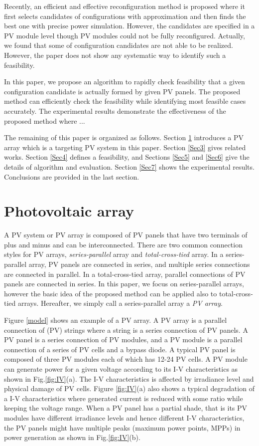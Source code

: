 \documentclass[conference]{IEEEtran}
\begin{document}
Recently, an efficient and effective reconfiguration method\cite{orozco2016optimized} is proposed where it first selects candidates of configurations with approximation and then finds the best one with precise power simulation. However, the candidates are specified in a PV module level though PV modules could not be fully reconfigured. Actually, we found that some of configuration candidates are not able to be realized. However, the paper\cite{orozco2016optimized}  does not show any systematic way to identify such a feasibility. 

In this paper, we propose an algorithm to rapidly check feasibility that a given configuration candidate is actually formed by given PV panels. The proposed method can efficiently check the feasibility while identifying most feasible cases accurately. The experimental results demonstrate the effectiveness of the proposed method where ...

The remaining of this paper is organized as follows. Section \ref{Sec2} introduces a PV array which is a targeting PV system in this paper. Section \ref{Sec3} gives related works. Section \ref{Sec4} defines a feasibility, and Sections \ref{Sec5} and \ref{Sec6} give the details of algorithm and evaluation. Section \ref{Sec7} shows the experimental results. Conclusions are provided in the last section.

\section{Photovoltaic array}\label{Sec2}
A PV system or PV array is composed of PV panels that have two terminals of plus and minus and can be interconnected. There are two common connection styles for PV arrays, \textit{series-parallel} array and \textit{total-cross-tied} array. 
In a series-parallel array, PV panels are connected in series, and multiple series connections are connected in parallel. In a total-cross-tied array, parallel connections of PV panels are connected in series. In this paper, we focus on series-parallel arrays, however the basic idea of the proposed method can be applied also to total-cross-tied arrays. Hereafter, we simply call a series-parallel array a \textit{PV array}. 

Figure \ref{model} shows an example of a PV array. A PV array is a parallel connection of (PV) strings where a string is a series connection of PV panels. A PV panel is a series connection of PV modules, and a PV module is a parallel connection of a series of PV cells and a bypass diode. A typical PV panel is composed of three PV modules each of which has 12-24 PV cells. A PV module can generate power for a given voltage according to its I-V characteristics as shown in Fig.\ref{fig:IV}(a). The I-V characteristics is affected by irradiance level and physical damage of PV cells. Figure \ref{fig:IV}(a) also shows a typical degradation of a I-V characteristics where generated current is reduced with some ratio while keeping the voltage range. When a PV panel has a partial shade, that is its PV modules have different irradiance levels and hence different I-V characteristics, the PV panels might have multiple peaks (maximum power points, MPPs) in power generation as shown in Fig.\ref{fig:IV}(b). 
\end{document}
